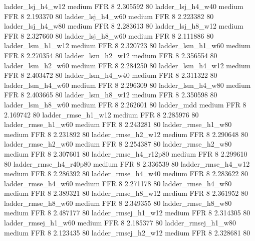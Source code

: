      ladder_lsj_h4_w12     medium      FFR                 8 2.305592 80
     ladder_lsj_h4_w40     medium      FFR                 8 2.193370 80
     ladder_lsj_h4_w60     medium      FFR                 8 2.223382 80
     ladder_lsj_h4_w80     medium      FFR                 8 2.283613 80
     ladder_lsj_h8_w12     medium      FFR                 8 2.327660 80
     ladder_lsj_h8_w60     medium      FFR                 8 2.111886 80
     ladder_lsm_h1_w12     medium      FFR                 8 2.320723 80
     ladder_lsm_h1_w60     medium      FFR                 8 2.270354 80
     ladder_lsm_h2_w12     medium      FFR                 8 2.356554 80
     ladder_lsm_h2_w60     medium      FFR                 8 2.284250 80
     ladder_lsm_h4_w12     medium      FFR                 8 2.403472 80
     ladder_lsm_h4_w40     medium      FFR                 8 2.311322 80
     ladder_lsm_h4_w60     medium      FFR                 8 2.296309 80
     ladder_lsm_h4_w80     medium      FFR                 8 2.403665 80
     ladder_lsm_h8_w12     medium      FFR                 8 2.350598 80
     ladder_lsm_h8_w60     medium      FFR                 8 2.262601 80
            ladder_mdd     medium      FFR                 8 2.169742 80
    ladder_rmse_h1_w12     medium      FFR                 8 2.285976 80
    ladder_rmse_h1_w60     medium      FFR                 8 2.243281 80
    ladder_rmse_h1_w80     medium      FFR                 8 2.231892 80
    ladder_rmse_h2_w12     medium      FFR                 8 2.290648 80
    ladder_rmse_h2_w60     medium      FFR                 8 2.254387 80
    ladder_rmse_h2_w80     medium      FFR                 8 2.307601 80
 ladder_rmse_h4_r12p80     medium      FFR                 8 2.299610 80
 ladder_rmse_h4_r40p80     medium      FFR                 8 2.336539 80
    ladder_rmse_h4_w12     medium      FFR                 8 2.286392 80
    ladder_rmse_h4_w40     medium      FFR                 8 2.283622 80
    ladder_rmse_h4_w60     medium      FFR                 8 2.271178 80
    ladder_rmse_h4_w80     medium      FFR                 8 2.389321 80
    ladder_rmse_h8_w12     medium      FFR                 8 2.361952 80
    ladder_rmse_h8_w60     medium      FFR                 8 2.349355 80
    ladder_rmse_h8_w80     medium      FFR                 8 2.487177 80
   ladder_rmsej_h1_w12     medium      FFR                 8 2.314305 80
   ladder_rmsej_h1_w60     medium      FFR                 8 2.185377 80
   ladder_rmsej_h1_w80     medium      FFR                 8 2.123435 80
   ladder_rmsej_h2_w12     medium      FFR                 8 2.328681 80
